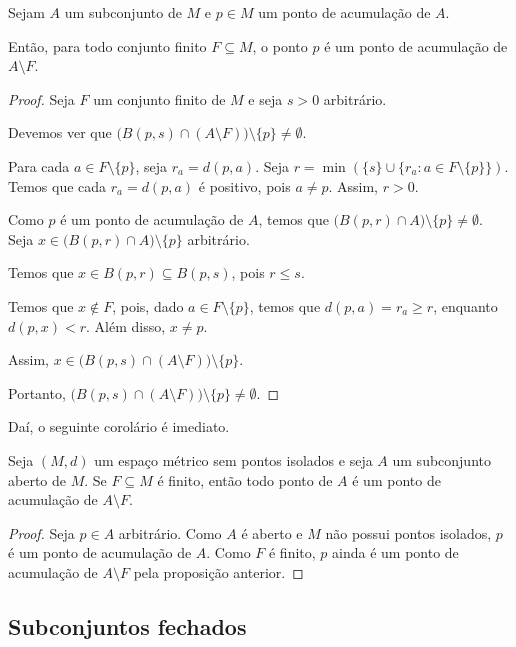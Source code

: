 \begin{proposition}\label{proposicaoPontoAcumulacaoRemocaoPontos}
    Sejam $A$ um subconjunto de $M$ e $p \in M$ um ponto de acumulação de $A$.

    Então, para todo conjunto finito $F\subseteq M$, o ponto $p$ é um ponto de acumulação de $A\setminus F$.
\end{proposition}
\begin{proof}
    Seja $F$ um conjunto finito de $M$ e seja $s>0$ arbitrário.

    Devemos ver que $\bigl(B(p, s)\cap (A\setminus F)\bigr)\setminus\{p\}\neq \emptyset$.

    Para cada $a \in F\setminus\{p\}$, seja $r_a = d(p, a)$.
    Seja $r = \min(\{s\}\cup\{r_a : a \in F\setminus\{p\}\})$.
    Temos que cada $r_a=d(p, a)$ é positivo, pois $a\neq p$.
    Assim, $r>0$.

    Como $p$ é um ponto de acumulação de $A$, temos que $\bigl(B(p, r)\cap A\bigr)\setminus\{p\}\neq \emptyset$.
    Seja $x \in \bigl(B(p, r)\cap A\bigr)\setminus\{p\}$ arbitrário.

    Temos que $x\in B(p, r)\subseteq B(p, s)$, pois $r\leq s$.

    Temos que $x\notin F$, pois, dado $a \in F\setminus\{p\}$, temos que $d(p, a)=r_a\geq r$, enquanto $d(p, x)<r$.
    Além disso, $x\neq p$.

    Assim, $x \in \bigl(B(p, s)\cap (A\setminus F)\bigr)\setminus\{p\}$.

    Portanto, $\bigl(B(p, s)\cap (A\setminus F)\bigr)\setminus\{p\}\neq \emptyset$.
\end{proof}

Daí, o seguinte corolário é imediato.
\begin{corollary}
    Seja $(M,d)$ um espaço métrico sem pontos isolados e seja $A$ um subconjunto aberto de $M$.
    Se $F\subseteq M$ é finito, então todo ponto de $A$ é um ponto de acumulação de $A\setminus F$.
\end{corollary}
\begin{proof}
    Seja $p \in A$ arbitrário.
    Como $A$ é aberto e $M$ não possui pontos isolados, $p$ é um ponto de acumulação de $A$.
    Como $F$ é finito, $p$ ainda é um ponto de acumulação de $A\setminus F$ pela proposição anterior.
\end{proof}

\subsection{Subconjuntos fechados}

